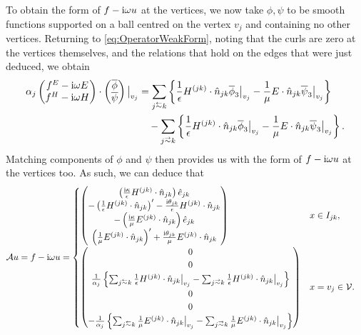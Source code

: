 \documentclass[11pt]{report}
\newcommand{\aop}{\mathcal{A}}
\begin{document}
To obtain the form of $f-\mathrm{i}\omega u$ at the vertices, we now take $\phi, \psi$ to be smooth functions supported on a ball centred on the vertex $v_j$ and containing no other vertices.
Returning to \eqref{eq:OperatorWeakForm}, noting that the curls are zero at the vertices themselves, and the relations that hold on the edges that were just deduced, we obtain
\begin{align*}
	\alpha_j\begin{pmatrix} f^E - \rmi\omega E \\ f^H - \rmi\omega H \end{pmatrix} \cdot\begin{pmatrix} \overline{\phi} \\ \overline{\psi} \end{pmatrix}\big\vert_{v_j} &= 
	\sum_{j\conRight k} \clbracs{\recip{\epsilon}H^{(jk)}\cdot\hat{n}_{jk}\overline{\phi}_3\big\vert_{v_j}	 - \recip{\mu}E\cdot\hat{n}_{jk}\overline{\psi}_3\big\vert_{v_j}}	 \\
	&\quad - \sum_{j\conLeft k} \clbracs{\recip{\epsilon}H^{(jk)}\cdot\hat{n}_{jk}\overline{\phi}_3\big\vert_{v_j}	 - \recip{\mu}E\cdot\hat{n}_{jk}\overline{\psi}_3\big\vert_{v_j}}	.
\end{align*}
Matching components of $\phi$ and $\psi$ then provides us with the form of $f-\mathrm{i}\omega u$ at the vertices too.
As such, we can deduce that
\begin{align*}
	\aop u = f - \rmi\omega u &=
	\begin{cases}
		\begin{pmatrix}
			\bracs{\frac{\rmi\wavenumber}{\epsilon}H^{(jk)}\cdot\hat{n}_{jk}}\hat{e}_{jk} \\
			-\bracs{\recip{\epsilon}H^{(jk)}\cdot\hat{n}_{jk}}' - \frac{\rmi\qm_{jk}}{\epsilon}H^{(jk)}\cdot\hat{n}_{jk} \\
			-\bracs{\frac{\rmi\wavenumber}{\mu}E^{(jk)}\cdot\hat{n}_{jk}}\hat{e}_{jk} \\
			\bracs{\recip{\mu}E^{(jk)}\cdot\hat{n}_{jk}}' + \frac{\rmi\qm_{jk}}{\mu}E^{(jk)}\cdot\hat{n}_{jk}
		\end{pmatrix}
		& x\in I_{jk}, \\
		\begin{pmatrix}
			0 \\
			0 \\
			\recip{\alpha_j}\clbracs{ \sum_{j\conRight k}\recip{\epsilon}H^{(jk)}\cdot\hat{n}_{jk}\big\vert_{v_j} - \sum_{j\conLeft k}\recip{\epsilon}H^{(jk)}\cdot\hat{n}_{jk}\big\vert_{v_j} } \\
			0 \\
			0 \\
			-\recip{\alpha_j}\clbracs{ \sum_{j\conRight k}\recip{\mu}E^{(jk)}\cdot\hat{n}_{jk}\big\vert_{v_j} - \sum_{j\conLeft k}\recip{\mu}E^{(jk)}\cdot\hat{n}_{jk}\big\vert_{v_j} }
		\end{pmatrix}
		& x=v_j\in\vertSet.
	\end{cases}
\end{align*}
\end{document}
